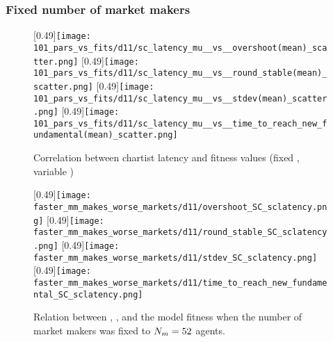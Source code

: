 \subsubsection*{Fixed number of market makers}

\begin{figure}
	\centering
	[0.49\linewidth]{\texttt{[image: 101\_pars\_vs\_fits/d11/sc\_latency\_mu\_\_vs\_\_overshoot(mean)\_scatter.png]}}
	[0.49\linewidth]{\texttt{[image: 101\_pars\_vs\_fits/d11/sc\_latency\_mu\_\_vs\_\_round\_stable(mean)\_scatter.png]}}
	\vspace{0.5cm}
	[0.49\linewidth]{\texttt{[image: 101\_pars\_vs\_fits/d11/sc\_latency\_mu\_\_vs\_\_stdev(mean)\_scatter.png]}}
	[0.49\linewidth]{\texttt{[image: 101\_pars\_vs\_fits/d11/sc\_latency\_mu\_\_vs\_\_time\_to\_reach\_new\_fundamental(mean)\_scatter.png]}}
	\caption{Correlation between chartist latency and fitness values (fixed \ssmmnAgents, variable \scnAgents)}
	\label{fig:d11_parvfit_sclatencymu}
\end{figure}

\begin{figure}
     \centering
     \subcaptionbox{}
     [0.49\linewidth]{\texttt{[image: faster\_mm\_makes\_worse\_markets/d11/overshoot\_SC\_sclatency.png]}}
     \subcaptionbox{}
     [0.49\linewidth]{\texttt{[image: faster\_mm\_makes\_worse\_markets/d11/round\_stable\_SC\_sclatency.png]}}
     \vspace{0.5cm}
     \subcaptionbox{}
     [0.49\linewidth]{\texttt{[image: faster\_mm\_makes\_worse\_markets/d11/stdev\_SC\_sclatency.png]}}
     \subcaptionbox{}
     [0.49\linewidth]{\texttt{[image: faster\_mm\_makes\_worse\_markets/d11/time\_to\_reach\_new\_fundamental\_SC\_sclatency.png]}}
     \caption{Relation between \scnAgents, \sclatencymu, and the model fitness when the number of market makers was fixed to $N_{m} = 52$ agents.}
     \label{fig:faster_mm_makes_worse_markets/d11/SC_sclatency}
\end{figure}

